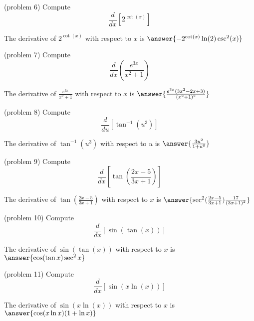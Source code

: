 \documentclass{ximera}
\begin{document}
\begin{problem}(problem 6)
  Compute
  \[
  \frac{d}{dx} \left[2^{\cot(x)}\right]
  \]
  
    
    
		The derivative of $2^{\cot(x)}$ with respect to $x$ is
		 $\answer{-2^{\cot(x)}\ln(2)\csc^2(x)}$
		
\end{problem}



\begin{problem}(problem 7)
  Compute
  \[
  \frac{d}{dx} \left(\frac{e^{3x}}{x^2 + 1}\right)
  \]
  
    
		The derivative of $\frac{e^{3x}}{x^2 + 1}$ with respect to $x$ is
		 $\answer{\frac{e^{3x}(3x^2 -2x +3)}{(x^2 + 1)^2}}$
		
\end{problem}



\begin{problem}(problem 8)
  Compute
  \[
  \frac{d}{du} \left[\tan^{-1}(u^3)\right]
  \]
  
    
		The derivative of $\tan^{-1}(u^3)$ with respect to $u$ is
		 $\answer{\frac{3u^2}{1+u^6}}$
		
\end{problem}




\begin{problem}(problem 9)
  Compute
  \[
  \frac{d}{dx} \left[\tan\left(\frac{2x-5}{3x+1}\right)\right]
  \]
  
   
		The derivative of $\tan\left(\frac{2x-5}{3x+1}\right)$ with respect to $x$ is
		 $\answer{\sec^2(\frac{2x-5}{3x+1})\frac{17}{(3x+1)^2}}$
		
\end{problem}


\begin{problem}(problem 10)
  Compute
  \[
  \frac{d}{dx} \left[\sin(\tan (x))\right]
  \]
  
    
		The derivative of $\sin(\tan (x))$ with respect to $x$ is
		 $\answer{\cos(\tan x)\sec^2 x}$
		
\end{problem}



\begin{problem}(problem 11)
  Compute
  \[
  \frac{d}{dx} \left[\sin(x\ln (x))\right]
  \]
  
    
		The derivative of $\sin(x\ln (x))$ with respect to $x$ is
		 $\answer{\cos(x\ln x)(1+\ln x)}$
		
\end{problem}
\end{document}
